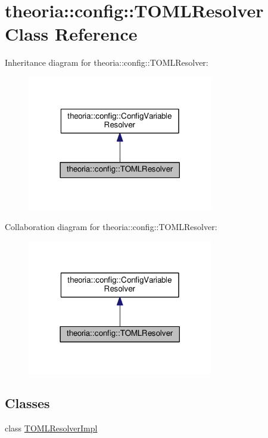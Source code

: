 \hypertarget{classtheoria_1_1config_1_1TOMLResolver}{}\section{theoria\+:\+:config\+:\+:T\+O\+M\+L\+Resolver Class Reference}
\label{classtheoria_1_1config_1_1TOMLResolver}


Inheritance diagram for theoria\+:\+:config\+:\+:T\+O\+M\+L\+Resolver\+:
\nopagebreak
\begin{figure}[H]
\begin{center}
\leavevmode
\includegraphics[width=230pt]{classtheoria_1_1config_1_1TOMLResolver__inherit__graph}
\end{center}
\end{figure}


Collaboration diagram for theoria\+:\+:config\+:\+:T\+O\+M\+L\+Resolver\+:
\nopagebreak
\begin{figure}[H]
\begin{center}
\leavevmode
\includegraphics[width=230pt]{classtheoria_1_1config_1_1TOMLResolver__coll__graph}
\end{center}
\end{figure}
\subsection*{Classes}
\begin{DoxyCompactItemize}
\item 
class \hyperlink{classTOMLResolver_1_1TOMLResolverImpl}{T\+O\+M\+L\+Resolver\+Impl}
\end{DoxyCompactItemize}
